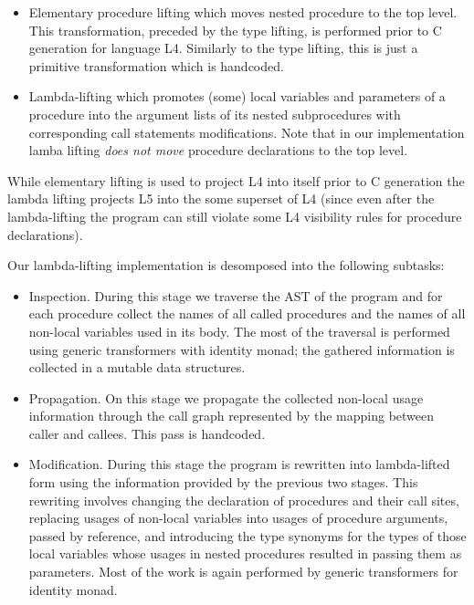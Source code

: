 \begin{itemize}
\item Elementary procedure lifting which moves nested procedure to the top level. This transformation, 
preceded by the type lifting, is performed prior to C generation for language L4. Similarly to the type lifting, 
this is just a primitive transformation which is handcoded.

\item Lambda-lifting which promotes (some) local variables and parameters of a procedure into the
argument lists of its nested subprocedures with corresponding call statements modifications. Note that in
our implementation lamba lifting \emph{does not move} procedure declarations to the top level.
\end{itemize}

While elementary lifting is used to project L4 into itself prior to C generation the lambda lifting
projects L5 into the some superset of L4 (since even after the lambda-lifting the program can still violate
some L4 visibility rules for procedure declarations). 

Our lambda-lifting implementation is desomposed into the following subtasks:

\begin{itemize}
\item Inspection. During this stage we traverse the AST of the program and for each procedure collect the 
names of all called procedures and the names of all non-local variables used in its body. The most of the 
traversal is performed using generic transformers with identity monad; the gathered information is 
collected in a mutable data structures. 

\item Propagation. On this stage we propagate the collected non-local usage information through the call
graph represented by the mapping between caller and callees. This pass is handcoded.

\item Modification. During this stage the program is rewritten into lambda-lifted form using the information
provided by the previous two stages. This rewriting involves changing the declaration of procedures and
their call sites, replacing usages of non-local variables into usages of procedure arguments, passed by 
reference, and introducing the type synonyms for the types of those local variables whose usages in 
nested procedures resulted in passing them as parameters. Most of the work is again performed by
generic transformers for identity monad.
\end{itemize}

